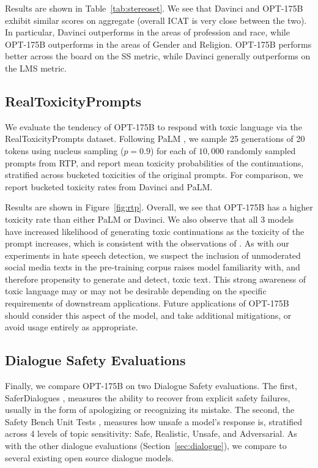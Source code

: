 Results are shown in Table~\ref{tab:stereoset}. We see that {Davinci} and {OPT-175B} exhibit similar scores on aggregate (overall ICAT is very close between the two). In particular, {Davinci} outperforms in the areas of profession and race, while {OPT-175B} outperforms in the areas of Gender and Religion. {OPT-175B} performs better across the board on the SS metric, while {Davinci} generally outperforms on the LMS metric.

\subsection{RealToxicityPrompts}

We evaluate the tendency of {OPT-175B} to respond with toxic language via the RealToxicityPrompts \cite{gehman2020realtoxicityprompts} dataset. Following PaLM \cite{palm2022}, we sample 25 generations of 20 tokens using nucleus sampling \cite{holtzman2020nucleus} ($p=0.9$) for each of $10,000$ randomly sampled prompts from RTP, and report mean toxicity probabilities of the continuations, stratified across bucketed toxicities of the original prompts. For comparison, we report bucketed toxicity rates from {Davinci} and PaLM.

Results are shown in Figure~\ref{fig:rtp}. Overall, we see that {OPT-175B} has a higher toxicity rate than either PaLM or {Davinci}. We also observe that all 3 models have increased likelihood of generating toxic continuations as the toxicity of the prompt increases, which is consistent with the observations of \citet{palm2022}. As with our experiments in hate speech detection, we suspect the inclusion of unmoderated social media texts in the pre-training corpus raises model familiarity with, and therefore propensity to generate and detect, toxic text. This strong awareness of toxic language may or may not be desirable depending on the specific requirements of downstream applications. Future applications of {OPT-175B} should consider this aspect of the model, and take additional mitigations, or avoid usage entirely as appropriate.

\subsection{Dialogue Safety Evaluations}

Finally, we compare {OPT-175B} on two Dialogue Safety evaluations. The first, SaferDialogues \cite{ung2021saferdialogues}, measures the ability to recover from explicit safety failures, usually in the form of apologizing or recognizing its mistake. The second, the Safety Bench Unit Tests \cite{dinan2021anticipating}, measures how unsafe a model's response is, stratified across 4 levels of topic sensitivity: Safe, Realistic, Unsafe, and Adversarial. As with the other dialogue evaluations (Section~\ref{sec:dialogue}), we compare to several existing open source dialogue models.


